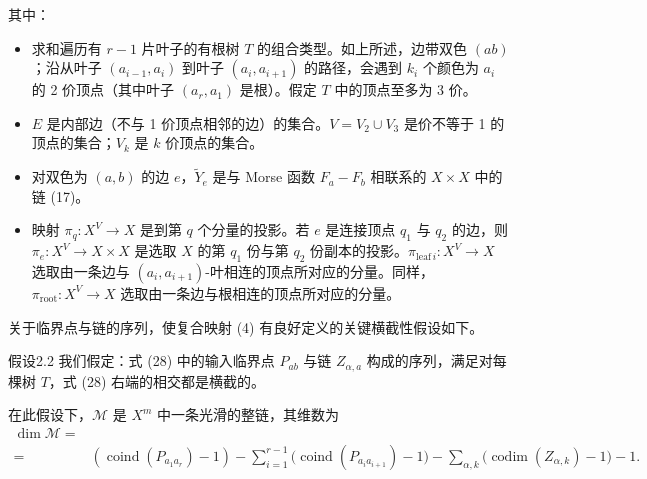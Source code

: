 其中：

\begin{itemize}
  \item 求和遍历有 $r-1$ 片叶子的有根树 $T$ 的组合类型。如上所述，边带双色 $(ab)$；沿从叶子 $(a_{i-1},a_i)$ 到叶子 $(a_i,a_{i+1})$ 的路径，会遇到 $k_i$ 个颜色为 $a_i$ 的 2 价顶点（其中叶子 $(a_r,a_1)$ 是根）。假定 $T$ 中的顶点至多为 3 价。
  \item $E$ 是内部边（不与 1 价顶点相邻的边）的集合。$V=V_2\cup V_3$ 是价不等于 1 的顶点的集合；$V_k$ 是 $k$ 价顶点的集合。
  \item 对双色为 $(a,b)$ 的边 $e$，$\widetilde Y_e$ 是与 Morse 函数 $F_a-F_b$ 相联系的 $X\times X$ 中的链 (17)。
  \item 映射 $\pi_q\colon X^V\to X$ 是到第 $q$ 个分量的投影。若 $e$ 是连接顶点 $q_1$ 与 $q_2$ 的边，则 $\pi_e\colon X^V\to X\times X$ 是选取 $X$ 的第 $q_1$ 份与第 $q_2$ 份副本的投影。$\pi_{\mathrm{leaf}\,i}\colon X^V\to X$ 选取由一条边与 $(a_i,a_{i+1})$-叶相连的顶点所对应的分量。同样，$\pi_{\mathrm{root}}\colon X^V\to X$ 选取由一条边与根相连的顶点所对应的分量。
\end{itemize}


关于临界点与链的序列，使复合映射 (4) 有良好定义的关键横截性假设如下。

\begin{thmenv}{假设}{2.2}\label{ass:2.2}
我们假定：式 (28) 中的输入临界点 $P_{ab}$ 与链 $Z_{\alpha,a}$ 构成的序列，满足对每棵树 $T$，式 (28) 右端的相交都是横截的。
\end{thmenv}

在此假设下，$\mathcal M$ 是 $X^m$ 中一条光滑的整链，其维数为
\[
\begin{aligned}
  \dim\mathcal M={}&\\
  ={}&(\operatorname{coind}(P_{a_1a_r})-1)
  -\sum_{i=1}^{r-1}\bigl(\operatorname{coind}(P_{a_ia_{i+1}})-1\bigr)
  -\sum_{\alpha,k}\bigl(\operatorname{codim}(Z_{\alpha,k})-1\bigr)-1.
\end{aligned}
\]


